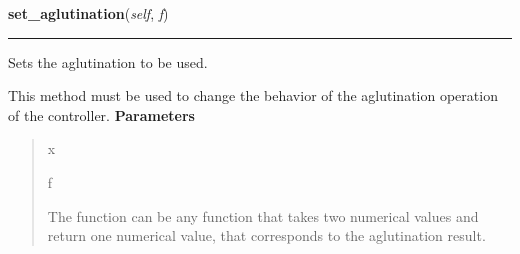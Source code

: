 \hspace{.8\funcindent}\begin{boxedminipage}{\funcwidth}

    \raggedright \textbf{set\_aglutination}(\textit{self}, \textit{f})

    \vspace{-1.5ex}

    \rule{\textwidth}{0.5\fboxrule}
\setlength{\parskip}{2ex}

Sets the aglutination to be used.

This method must be used to change the behavior of the aglutination
operation of the controller.
\setlength{\parskip}{1ex}
      \textbf{Parameters}
      \vspace{-1ex}

      \begin{quote}
        \begin{Ventry}{x}

          \item[f]


The function can be any function that takes two numerical values and
return one numerical value, that corresponds to the aglutination
result.
        \end{Ventry}

      \end{quote}

    \end{boxedminipage}

    \label{peach:fuzzy:control:Controller:add_rule}

    \vspace{0.5ex}

